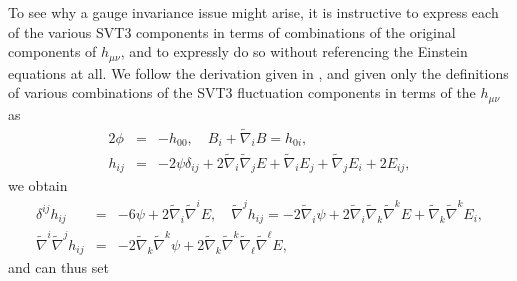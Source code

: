 To see why a gauge invariance issue might arise, it is instructive to express each of the various SVT3 components in terms  of combinations of the original components of $h_{\mu\nu}$, and to expressly do so without referencing the Einstein equations at all. We follow the derivation given in \cite{amarasinghe_2019}, and given only the definitions of various combinations of the SVT3 fluctuation components  in terms of the $h_{\mu\nu}$ as
%
\begin{eqnarray}
2\phi&=&-h_{00},\quad B_i+\tilde{\nabla}_iB=h_{0i},
\nonumber\\
h_{ij}&=&-2\psi\delta_{ij} +2\tilde{\nabla}_i\tilde{\nabla}_j E + \tilde{\nabla}_i E_j + \tilde{\nabla}_j E_i + 2E_{ij},
\label{2.4}
\end{eqnarray}
%
we obtain
%
\begin{eqnarray}
\delta^{ij}h_{ij}&=&-6\psi+2\tilde{\nabla}_i\tilde{\nabla}^iE,\quad
\tilde{\nabla}^jh_{ij}=-2\tilde{\nabla}_i\psi+2\tilde{\nabla}_i\tilde{\nabla}_k\tilde{\nabla}^kE+\tilde{\nabla}_k\tilde{\nabla}^kE_{i},
\nonumber\\
\tilde{\nabla}^i \tilde{\nabla}^jh_{ij}&=&-2\tilde{\nabla}_k\tilde{\nabla}^k\psi+2\tilde{\nabla}_k\tilde{\nabla}^k\tilde{\nabla}_{\ell}\tilde{\nabla}^{\ell}E,
\label{2.5}
\end{eqnarray}
%
and can thus set 
%
